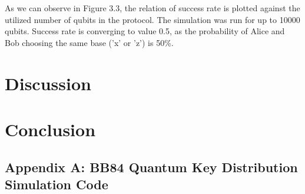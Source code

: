 \documentclass[12pt,a4paper] {report}
\begin{document}
		As we can observe in Figure 3.3, the relation of success rate is plotted against the utilized 
		number of qubits in the protocol. The simulation was run for up to 10000 qubits. 
		Success rate is converging to value 0.5, as the probability 
		of Alice and Bob choosing the same base ('x' or 'z') is 50\%.

	\chapter{Discussion}

	\chapter{Conclusion}





\appendix

\section*{Appendix A: BB84 Quantum Key Distribution Simulation Code}
\end{document}
